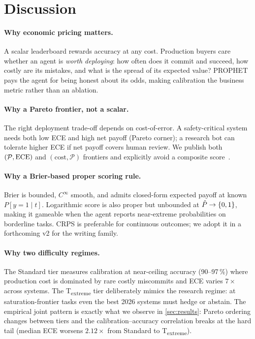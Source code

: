 \section{Discussion}\label{sec:discussion}

\paragraph{Why economic pricing matters.}
A scalar leaderboard rewards accuracy at any cost. Production buyers
care whether an agent is \emph{worth deploying}: how often does it
commit and succeed, how costly are its mistakes, and what is the
spread of its expected value? PROPHET pays the agent for being honest
about its odds, making calibration the business metric rather than an
ablation.

\paragraph{Why a Pareto frontier, not a scalar.}
The right deployment trade-off depends on cost-of-error. A
safety-critical system needs both low ECE and high net payoff
(Pareto corner); a research bot can tolerate higher ECE if net payoff
covers human review. We publish both
$(\mathcal{P}, \mathrm{ECE})$ and $(\text{cost}, \mathcal{P})$ frontiers and
explicitly avoid a composite score~\cite{crs_composite}.

\paragraph{Why a Brier-based proper scoring rule.}
Brier is bounded, $C^\infty$ smooth, and admits closed-form expected
payoff at known $P[y=1\!\mid\!t]$. Logarithmic score is also proper
but unbounded at $\hat{P} \to \{0, 1\}$, making it gameable when the
agent reports near-extreme probabilities on borderline tasks. CRPS is
preferable for continuous outcomes; we adopt it in a forthcoming v2
for the writing family.

\paragraph{Why two difficulty regimes.}
The Standard tier measures calibration at near-ceiling accuracy
(90--97\,\%) where production cost is dominated by rare costly
miscommits and ECE varies $7\times$ across systems. The
T\textsubscript{extreme} tier deliberately mimics the research
regime: at saturation-frontier tasks even the best 2026 systems must
hedge or abstain. The empirical joint pattern is exactly what we
observe in \autoref{sec:results}: Pareto ordering changes between
tiers and the calibration--accuracy correlation breaks at the hard
tail (median ECE worsens $2.12\times$ from Standard to
T\textsubscript{extreme}).

